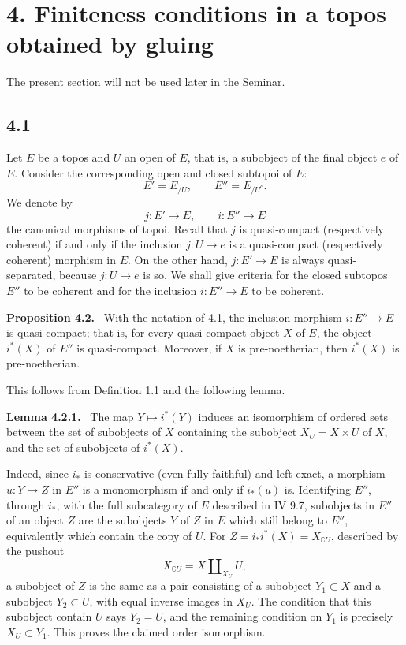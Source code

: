\documentclass[11pt]{article}
\newenvironment{statement}[1]{\par\medskip\noindent\textbf{#1.}\ }{\par\medskip}
\begin{document}
\section*{4. Finiteness conditions in a topos obtained by gluing}

The present section will not be used later in the Seminar.

\subsection*{4.1}
Let \(E\) be a topos and \(U\) an open of \(E\), that is, a subobject of the final object \(e\) of \(E\). Consider the corresponding open and closed subtopoi of \(E\):
\[
 E'=E_{/U},\qquad E''=E_{/U^c}.
\]
We denote by
\[
 j:E'\to E,\qquad i:E''\to E
\]
the canonical morphisms of topoi. Recall that \(j\) is quasi-compact (respectively coherent) if and only if the inclusion \(j:U\to e\) is a quasi-compact (respectively coherent) morphism in \(E\). On the other hand, \(j:E'\to E\) is always quasi-separated, because \(j:U\to e\) is so. We shall give criteria for the closed subtopos \(E''\) to be coherent and for the inclusion \(i:E''\to E\) to be coherent.

\begin{statement}{Proposition 4.2}
With the notation of 4.1, the inclusion morphism \(i:E''\to E\) is quasi-compact; that is, for every quasi-compact object \(X\) of \(E\), the object \(i^*(X)\) of \(E''\) is quasi-compact. Moreover, if \(X\) is pre-noetherian, then \(i^*(X)\) is pre-noetherian.
\end{statement}

This follows from Definition 1.1 and the following lemma.

\begin{statement}{Lemma 4.2.1}
The map \(Y\mapsto i^*(Y)\) induces an isomorphism of ordered sets between the set of subobjects of \(X\) containing the subobject \(X_U=X\times U\) of \(X\), and the set of subobjects of \(i^*(X)\).
\end{statement}

Indeed, since \(i_*\) is conservative (even fully faithful) and left exact, a morphism \(u:Y\to Z\) in \(E''\) is a monomorphism if and only if \(i_*(u)\) is. Identifying \(E''\), through \(i_*\), with the full subcategory of \(E\) described in IV 9.7, subobjects in \(E''\) of an object \(Z\) are the subobjects \(Y\) of \(Z\) in \(E\) which still belong to \(E''\), equivalently which contain the copy of \(U\). For \(Z=i_*i^*(X)=X_{\complement U}\), described by the pushout
\[
  X_{\complement U}=X\amalg_{X_U} U,
\]
a subobject of \(Z\) is the same as a pair consisting of a subobject \(Y_1\subset X\) and a subobject \(Y_2\subset U\), with equal inverse images in \(X_U\). The condition that this subobject contain \(U\) says \(Y_2=U\), and the remaining condition on \(Y_1\) is precisely \(X_U\subset Y_1\). This proves the claimed order isomorphism.
\end{document}
